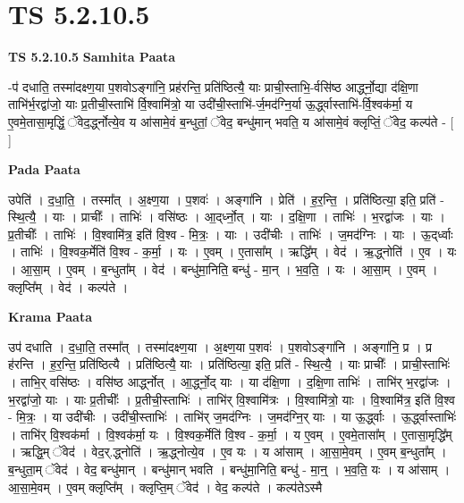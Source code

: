 \documentclass[17pt]{extarticle}
\begin{document}
\section{ TS 5.2.10.5 }

\textbf{TS 5.2.10.5 } \newline
\textbf{Samhita Paata} \newline

-प॑ दधाति॒ तस्मा॑दक्ष्ण॒या प॒शवोऽङ्गा॑नि॒ प्रह॑रन्ति॒ प्रति॑ष्ठित्यै॒ याः प्राची॒स्ताभि॒-र्वसि॑ष्ठ आर्द्ध्नो॒द्या द॑क्षि॒णा ताभि॑र्भ॒रद्वा॑जो॒ याः प्र॒तीची॒स्ताभि॑ र्वि॒श्वामि॑त्रो॒ या उदी॑ची॒स्ताभि॑-र्ज॒मद॑ग्नि॒र्या ऊ॒र्द्ध्वास्ताभि॑-र्वि॒श्वक॑र्मा॒ य ए॒वमे॒तासा॒मृद्धिं॒ ॅवेद॒र्द्ध्नोत्ये॒व य आ॑सामे॒वं ब॒न्धुतां॒ ॅवेद॒ बन्धु॑मान् भवति॒ य आ॑सामे॒वं क्लृप्तिं॒ ॅवेद॒ कल्प॑ते - [  ] \newline

\textbf{Pada Paata} \newline

उपेति॑ । द॒धा॒ति॒ । तस्मा᳚त् । अ॒क्ष्ण॒या । प॒शवः॑ । अङ्गा॑नि । प्रेति॑ । ह॒र॒न्ति॒ । प्रति॑ष्ठित्या॒ इति॒ प्रति॑ - स्थि॒त्यै॒ । याः । प्राचीः᳚ । ताभिः॑ । वसि॑ष्ठः । आ॒द्‌र्ध्नो॒त् । याः । द॒क्षि॒णा । ताभिः॑ । भ॒रद्वा॑जः । याः । प्र॒तीचीः᳚ । ताभिः॑ । वि॒श्वामि॑त्र॒ इति॑ वि॒श्व - मि॒त्रः॒ । याः । उदी॑चीः । ताभिः॑ । ज॒मद॑ग्निः । याः । ऊ॒द्‌र्ध्वाः । ताभिः॑ । वि॒श्वक॒र्मेति॑ वि॒श्व - क॒र्मा॒ । यः । ए॒वम् । ए॒तासा᳚म् । ऋद्धि᳚म् । वेद॑ । ऋ॒द्ध्नोति॑ । ए॒व । यः । आ॒सा॒म् । ए॒वम् । ब॒न्धुता᳚म् । वेद॑ । बन्धु॑मा॒निति॒ बन्धु॑ - मा॒न् । भ॒व॒ति॒ । यः । आ॒सा॒म् । ए॒वम् । क्लृप्ति᳚म् । वेद॑ । कल्प॑ते ।  \newline


\textbf{Krama Paata} \newline

उप॑ दधाति । द॒धा॒ति॒ तस्मा᳚त् । तस्मा॑दक्ष्ण॒या । अ॒क्ष्ण॒या प॒शवः॑ । प॒शवोऽङ्गा॑नि । अङ्गा॑नि॒ प्र । प्र ह॑रन्ति । ह॒र॒न्ति॒ प्रति॑ष्ठित्यै । प्रति॑ष्ठित्यै॒ याः । प्रति॑ष्ठित्या॒ इति॒ प्रति॑ - स्थि॒त्यै॒ । याः प्राचीः᳚ । प्राची॒स्ताभिः॑ । ताभि॒र् वसि॑ष्ठः । वसि॑ष्ठ आर्द्ध्नोत् । आ॒र्द्ध्नो॒द् याः । या द॑क्षि॒णा । द॒क्षि॒णा ताभिः॑ । 
ताभि॑र् भ॒रद्वा॑जः । भ॒रद्वा॑जो॒ याः । याः प्र॒तीचीः᳚ । प्र॒तीची॒स्ताभिः॑ । ताभि॑र् वि॒श्वामि॑त्रः । वि॒श्वामि॑त्रो॒ याः । वि॒श्वामि॑त्र॒ इति॑ वि॒श्व - मि॒त्रः॒ । या उदी॑चीः । उदी॑ची॒स्ताभिः॑ । ताभि॑र् ज॒मद॑ग्निः । ज॒मद॑ग्नि॒र् याः । या ऊ॒र्द्ध्वाः । ऊ॒र्द्ध्वास्ताभिः॑ । ताभि॑र् वि॒श्वक॑र्मा । वि॒श्वक॑र्मा॒ यः । वि॒श्वक॒र्मेति॑ वि॒श्व - क॒र्मा॒ । य ए॒वम् । ए॒वमे॒तासा᳚म् । ए॒तासा॒मृद्धि᳚म् । ऋद्धि॒म् ॅवेद॑ । वेद॒र्.द्ध्नोति॑ । ऋ॒द्ध्नोत्ये॒व । ए॒व यः । य आ॑साम् । आ॒सा॒मे॒वम् । ए॒वम् ब॒न्धुता᳚म् । ब॒न्धुता॒म् ॅवेद॑ । वेद॒ बन्धु॑मान् । बन्धु॑मान् भवति । बन्धु॑मा॒निति॒ बन्धु॑ - मा॒न्॒ । भ॒व॒ति॒ यः । य आ॑साम् । आ॒सा॒मे॒वम् । ए॒वम् क्लृप्ति᳚म् । क्लृप्ति॒म् ॅवेद॑ । वेद॒ कल्प॑ते । कल्प॑तेऽस्मै \newline
\end{document}
